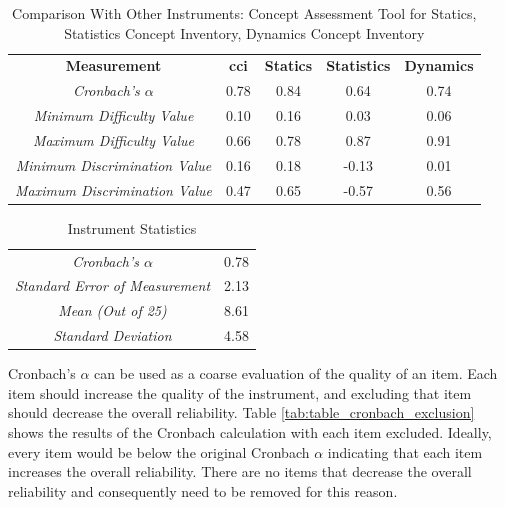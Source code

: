\FloatBarrier

\begin{table}[!htbp]   
\caption{Comparison With Other Instruments: Concept Assessment Tool for Statics, Statistics Concept Inventory, Dynamics Concept Inventory \cite{jorian}}   
\centering   
\begin{tabular}[width=\textwidth]{ccccc}   
    \toprule
    \textbf{Measurement} & \textbf{\gls{cci}} & \textbf{Statics} & \textbf{Statistics} & \textbf{Dynamics} \\
    \textit{Cronbach's $\alpha$} & 0.78 & 0.84 & 0.64 & 0.74\\   
    \textit{Minimum Difficulty Value} & 0.10 & 0.16 & 0.03 & 0.06 \\   
    \textit{Maximum Difficulty Value} & 0.66 & 0.78 & 0.87 & 0.91 \\   
    \textit{Minimum Discrimination Value} & 0.16 & 0.18 & -0.13 & 0.01\\
    \textit{Maximum Discrimination Value} & 0.47 & 0.65 & -0.57 & 0.56\\   
    \bottomrule   
\end{tabular}   
\label{tab:compare}   
\end{table}  

\begin{table}[!htbp]
\caption{Instrument Statistics}
\centering
\begin{tabular}{cc}
    \toprule
    \textit{Cronbach's $\alpha$} & 0.78 \\
    \textit{Standard Error of Measurement} & 2.13 \\
    \textit{Mean (Out of 25)} & 8.61\\
    \textit{Standard Deviation} & 4.58\\
    \bottomrule
\end{tabular}
\label{tab:overall}
\end{table}


Cronbach's $\alpha$ can be used as a coarse evaluation of the quality of an item. Each item should increase the quality of the instrument, and excluding that item should decrease the overall reliability. Table \ref{tab:table_cronbach_exclusion} shows the results of the Cronbach calculation with each item excluded. Ideally, every item would be below the original Cronbach $\alpha$ indicating that each item increases the overall reliability. There are no items that decrease the overall reliability and consequently need to be removed for this reason.

\iffalse
\iflong
\begin{figure}[ht]
    \begin{center}
    \advance\leftskip-.25cm
    \advance\rightskip-.25cm
    \texttt{[image: images/Cronobach's.png]}
    \caption{Cronbach's $\alpha$ with Items Excluded}
    \label{fig:cron}
\end{center}
\end{figure}
\fi
\fi


